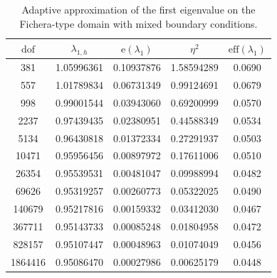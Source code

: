 \documentclass[onefignum,onetabnum,final]{siamart250211}
\numberwithin{equation}{section}
\newcommand\0{\boldsymbol{0}}
\begin{document}
\begin{table}[htbp!]
\centering
\caption{Adaptive approximation of the first eigenvalue on the Fichera-type domain with
mixed boundary conditions.}
\label{tab:fichera-eig1-mixed}
\begin{tabular}{c c c c c}
\hline
$\mathrm{dof}$ & $\lambda_{1,h}$ &
$\textrm{e}(\lambda_{1})$ & $\eta^2$ &
$\mathrm{eff}(\lambda_1)$ \\
\hline
381      & 1.05996361 & 0.10937876 & 1.58594289 & 0.0690 \\
557      & 1.01789834 & 0.06731349 & 0.99124691 & 0.0679 \\
998      & 0.99001544 & 0.03943060 & 0.69200999 & 0.0570 \\
2237     & 0.97439435 & 0.02380951 & 0.44588349 & 0.0534 \\
5134     & 0.96430818 & 0.01372334 & 0.27291937 & 0.0503 \\
10471    & 0.95956456 & 0.00897972 & 0.17611006 & 0.0510 \\
26354    & 0.95539531 & 0.00481047 & 0.09988994 & 0.0482 \\
69626    & 0.95319257 & 0.00260773 & 0.05322025 & 0.0490 \\
140679   & 0.95217816 & 0.00159332 & 0.03412030 & 0.0467 \\
367711   & 0.95143733 & 0.00085248 & 0.01804958 & 0.0472 \\
828157   & 0.95107447 & 0.00048963 & 0.01074049 & 0.0456 \\
1864416  & 0.95086470 & 0.00027986 & 0.00625179 & 0.0448 \\
\hline
\end{tabular}
\end{table}
\end{document}
